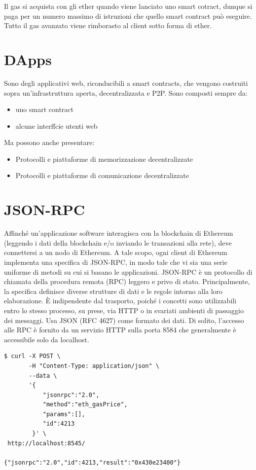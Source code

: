 Il gas si acquista con gli ether quando viene lanciato uno smart cotract,
dunque si paga per un numero massimo di istruzioni che quello smart contract può eseguire.
Tutto il gas avanzato viene rimborasto al client sotto forma di ether.

\section{DApps}

Sono degli applicativi web, riconducibili a smart contracts, che vengono costruiti sopra
un'infrastruttura aperta, decentralizzata e P2P.
Sono composti sempre da:

\begin{itemize}
    \item uno smart contract
    \item alcune interffcie utenti web
\end{itemize}

Ma possono anche presentare:

\begin{itemize}
    \item Protocolli e piattaforme di memorizzazione decentralizzate
    \item Protocolli e piattaforme di comunicazione decentralizzate
\end{itemize}

\section{JSON-RPC}

Affinché un'applicazione software interagisca con la blockchain di Ethereum
(leggendo i dati della blockchain e/o inviando le transazioni alla rete), deve connettersi a
un nodo di Ethereum.
A tale scopo, ogni client di Ethereum implementa una specifica di JSON-RPC, in modo tale che vi
sia una serie uniforme di metodi su cui si basano le applicazioni.
JSON-RPC è un protocollo di chiamata della procedura remota (RPC) leggero e privo di stato.
Principalmente, la specifica definisce diverse strutture di dati e le regole intorno alla loro
elaborazione. È indipendente dal trasporto, poiché i concetti sono utilizzabili entro lo stesso
processo, su prese, via HTTP o in svariati ambienti di passaggio dei messaggi. Usa JSON (RFC 4627)
come formato dei dati.
Di solito, l'accesso alle RPC è fornito da un servizio HTTP sulla porta 8584 che
generalmente è accessibile solo da localhost.

\begin{lstlisting}[caption=Esempio di richiesta tramite jsonrpc]
$ curl -X POST \ 
       -H "Content-Type: application/json" \  
       --data \
       '{
           "jsonrpc":"2.0",
           "method":"eth_gasPrice",
           "params":[],
           "id":4213
        }' \
 http://localhost:8545/
 
{"jsonrpc":"2.0","id":4213,"result":"0x430e23400"}
\end{lstlisting}

